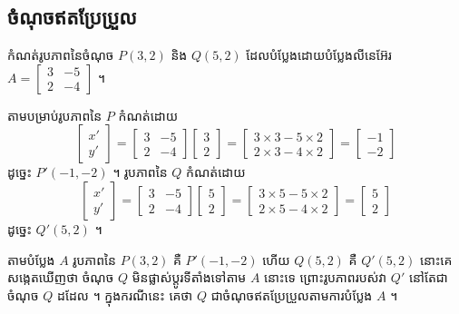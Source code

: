 \subsection{ចំណុចឥតប្រែប្រួល}

\begin{example}[ឧទាហរណ៍]
កំណត់រូបភាពនៃចំណុច $P(3, 2)$ និង $Q(5, 2)$ ដែលបំប្លែងដោយបំប្លែងលីនេអ៊ែរ $A = \begin{bmatrix} 3 & -5\\ 2 & -4 \end{bmatrix}$ ។
\end{example}
\ans
តាមបម្រាប់រូបភាពនៃ $P$ កំណត់ដោយ
\[ \begin{bmatrix} x'\\ y' \end{bmatrix} = \begin{bmatrix} 3 & -5\\ 2 & -4 \end{bmatrix}\begin{bmatrix} 3\\ 2 \end{bmatrix} = \begin{bmatrix} 3\times 3 - 5\times 2\\ 2\times 3 - 4\times 2 \end{bmatrix} = \begin{bmatrix} -1\\ -2 \end{bmatrix} \]
ដូច្នេះ $P'(-1, -2)$ ។ រូបភាពនៃ $Q$ កំណត់ដោយ
\[ \begin{bmatrix} x'\\ y' \end{bmatrix} = \begin{bmatrix} 3 & -5\\ 2 & -4 \end{bmatrix}\begin{bmatrix} 5\\ 2 \end{bmatrix} = \begin{bmatrix} 3\times 5 - 5\times 2\\ 2\times 5 - 4\times 2 \end{bmatrix} = \begin{bmatrix} 5\\ 2 \end{bmatrix} \]
ដូច្នេះ $Q'(5, 2)$ ។

តាមបំប្លែង $A$ រូបភាពនៃ $P(3, 2)$ គឺ $P'(-1, -2)$ ហើយ $Q(5, 2)$ គឺ $Q'(5, 2)$ នោះគេសង្កេតឃើញថា ចំណុច $Q$ មិនផ្លាស់ប្ដូរទីតាំងទៅតាម $A$ នោះទេ ព្រោះរូបភាពរបស់វា $Q'$ នៅតែជាចំណុច $Q$ ដដែល ។ ក្នុងករណីនេះ គេថា $Q$ ជាចំណុចឥតប្រែប្រួលតាមការបំប្លែង $A$ ។

